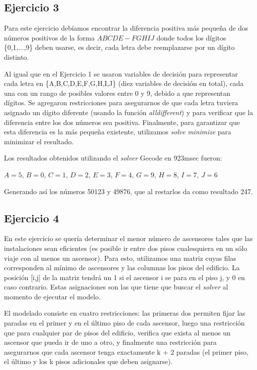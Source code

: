 \documentclass{article}
\begin{document}
\subsection{Ejercicio 3}

Para este ejercicio debíamos encontrar la diferencia positiva más pequeña de dos números positivos de la forma $ABCDE - FGHIJ$ donde todos los dígitos \{0,1,...,9\} deben usarse, es decir, cada letra debe reemplazarse por un dígito distinto.

Al igual que en el Ejercicio 1 se usaron variables de decisión para representar cada letra en \{A,B,C,D,E,F,G,H,I,J\} (diez variables de decisión en total), cada una con un rango de posibles valores entre 0 y 9, debido a que representan dígitos. Se agregaron restricciones para asegurarnos de que cada letra tuviera asignado un dígito diferente (usando la función \textit{alldifferent}) y para verificar que la diferencia entre los dos números sea positiva. Finalmente, para garantizar que esta diferencia es la más pequeña existente, utilizamos \textit{solve minimize} para minimizar el resultado.

Los resultados obtenidos utilizando el \textit{solver} Gecode en 923msec fueron:
\begin{center}
$A = 5$, $B = 0$, $C = 1$, $D = 2$, $E = 3$, $F = 4$, $G = 9$, $H = 8$, $I = 7$, $J = 6$
\end{center}
Generando así los números 50123 y 49876, que al restarlos da como resultado 247.

\subsection{Ejercicio 4}

En este ejercicio se quería determinar el menor número de ascensores tales que las instalaciones sean eficientes (es posible ir entre dos pisos cualesquiera en un sólo viaje con al menos un ascensor). Para esto, utilizamos una matriz cuyas filas corresponden al mínimo de ascensores y las columnas los pisos del edificio. La posición [i,j] de la matriz tendrá un 1 si el ascensor i se para en el piso j, y 0 en caso contrario. Estas asignaciones son las que tiene que buscar el \textit{solver} al momento de ejecutar el modelo. 

El modelado consiste en cuatro restricciones: las primeras dos permiten fijar las paradas en el primer y en el último piso de cada ascensor, luego una restricción que para cualquier par de pisos del edificio, verifica que exista al menos un ascensor que pueda ir de uno a otro, y finalmente una restricción para asegurarnos que cada ascensor tenga exactamente k + 2 paradas (el primer piso, el último y los k pisos adicionales que deben asignarse).
\end{document}
